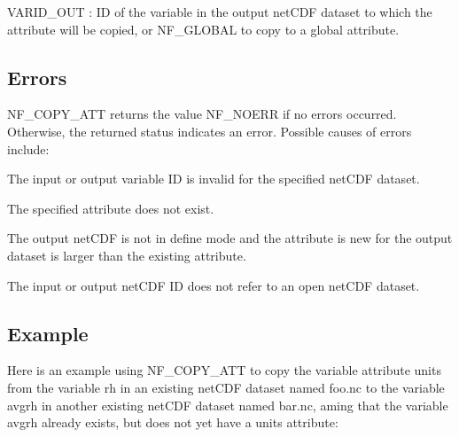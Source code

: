 {\ttfamily V\+A\+R\+I\+D\+\_\+\+O\+UT} \+: ID of the variable in the output net\+C\+DF dataset to which the attribute will be copied, or N\+F\+\_\+\+G\+L\+O\+B\+AL to copy to a global attribute.

\subsection*{Errors }

N\+F\+\_\+\+C\+O\+P\+Y\+\_\+\+A\+TT returns the value N\+F\+\_\+\+N\+O\+E\+RR if no errors occurred. Otherwise, the returned status indicates an error. Possible causes of errors include\+:


\begin{DoxyItemize}
\item The input or output variable ID is invalid for the specified net\+C\+DF dataset.
\item The specified attribute does not exist.
\item The output net\+C\+DF is not in define mode and the attribute is new for the output dataset is larger than the existing attribute.
\item The input or output net\+C\+DF ID does not refer to an open net\+C\+DF dataset.
\end{DoxyItemize}

\subsection*{Example }

Here is an example using N\+F\+\_\+\+C\+O\+P\+Y\+\_\+\+A\+TT to copy the variable attribute units from the variable rh in an existing net\+C\+DF dataset named foo.\+nc to the variable avgrh in another existing net\+C\+DF dataset named bar.\+nc, aming that the variable avgrh already exists, but does not yet have a units attribute\+:

 

